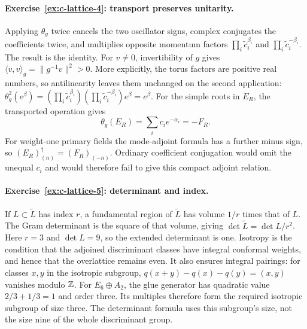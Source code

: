 \paragraph{Exercise~\ref{ex:c-lattice-4}: transport preserves unitarity.}
\label{sol:ex:c-lattice-4}
Applying $\theta_g$ twice cancels the two oscillator signs, complex
conjugates the coefficients twice, and multiplies opposite momentum
factors $\prod_i\widetilde c_i^{\beta_i}$ and
$\prod_i\widetilde c_i^{-\beta_i}$. The result is the identity.
For $v\ne0$, invertibility of $g$ gives
$\langle v,v\rangle_g=\|g^{-1}v\|^2>0$.
More explicitly, the torus factors are positive real numbers, so
antilinearity leaves them unchanged on the second application:
$\theta_g^2(e^\beta)=
(\prod_i\widetilde c_i^{\beta_i})
(\prod_i\widetilde c_i^{-\beta_i})e^\beta=e^\beta$.
For the simple roots in $E_R$, the transported operation gives
\[
 \theta_g(E_R)=\sum_i c_i e^{-\alpha_i}=-F_R.
\]
For weight-one primary fields the mode-adjoint formula has a further
minus sign, so $(E_R)_{(n)}^\dagger=(F_R)_{(-n)}$.
Ordinary coefficient conjugation would omit the unequal $c_i$
and would therefore fail to give this compact adjoint relation.



\paragraph{Exercise~\ref{ex:c-lattice-5}: determinant and index.}
\label{sol:ex:c-lattice-5}
If $L\subset\widetilde L$ has index $r$, a fundamental region of
$\widetilde L$ has volume $1/r$ times that of $L$. The Gram
determinant is the square of that volume, giving
$\det\widetilde L=\det L/r^2$. Here $r=3$ and $\det L=9$,
so the extended determinant is one. Isotropy is the condition that
the adjoined discriminant classes have integral conformal weights,
and hence that the overlattice remains even. It also ensures integral
pairings: for classes $x,y$ in the isotropic subgroup,
$q(x+y)-q(x)-q(y)=(x,y)$ vanishes modulo $\mathbb Z$.
For $E_6\oplus A_2$, the glue generator has quadratic value
$2/3+1/3=1$ and order three. Its multiples therefore form the
required isotropic subgroup of size three. The determinant formula
uses this subgroup's size, not the size nine of the whole
discriminant group.

